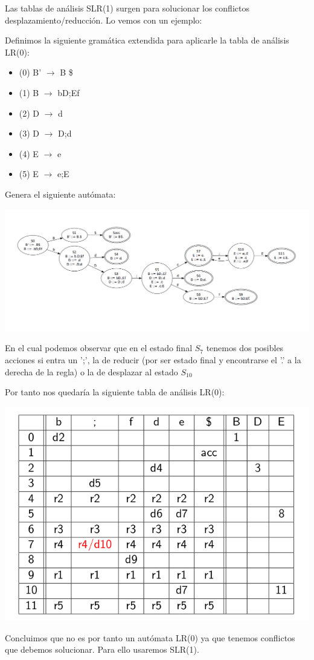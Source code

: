 \documentclass{apuntes}
\begin{document}
Las tablas de análisis SLR(1) surgen para solucionar los conflictos desplazamiento/reducción. Lo vemos con un ejemplo:
\newpage
\begin{example}
Definimos la siguiente gramática extendida para aplicarle la tabla de análisis LR(0):

\begin{itemize}
\item (0) B' $\rightarrow$ B \$
\item (1) B $\rightarrow$ bD;Ef
\item (2) D $\rightarrow$ d
\item (3) D $\rightarrow$ D;d
\item (4) E $\rightarrow$ e
\item (5) E $\rightarrow$ e;E
\end{itemize}

Genera el siguiente autómata:
\begin{center}
\includegraphics[scale=0.4]{img/automatalr0conflicto.jpg}
\end{center}

En el cual podemos observar que en el estado final $S_7$ tenemos dos posibles acciones si entra un ';', la de reducir (por ser estado final y encontrarse el '.' a la derecha de la regla) o la de desplazar al estado $S_{10}$

Por tanto nos quedaría la siguiente tabla de análisis LR(0):

\begin{center}
\includegraphics[scale=0.3]{img/tablaanalisislr0conflicto.jpg}
\end{center}
\end{example}
Concluimos que no es por tanto un autómata LR(0) ya que tenemos conflictos que debemos solucionar. Para ello usaremos SLR(1).
\end{document}
